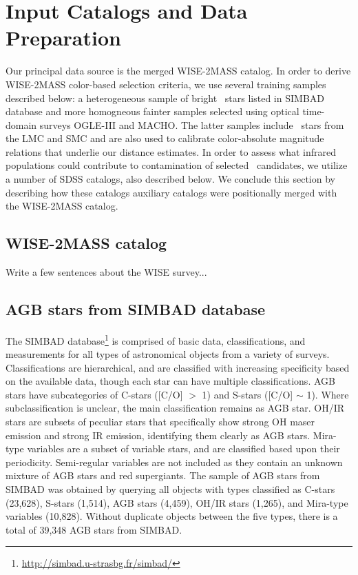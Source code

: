 \section{Input Catalogs and Data Preparation}
\label{sec:data}

Our principal data source is the merged WISE-2MASS catalog. In order to derive
WISE-2MASS color-based selection criteria, we use several training samples
described below: a heterogeneous sample of bright \agb\ stars listed in 
SIMBAD database and more homogneous fainter samples selected using 
optical time-domain surveys OGLE-III and MACHO. The latter samples 
include \agb\ stars from the LMC and SMC and are also used to 
calibrate color-absolute magnitude relations that underlie our distance
estimates. In order to assess what infrared populations could contribute to
contamination of selected \agb\ candidates, we utilize a number of SDSS
catalogs, also described below. We conclude this section by describing
how these catalogs auxiliary catalogs were  positionally merged with the 
WISE-2MASS catalog. 

\subsection{WISE-2MASS catalog}
Write a few sentences about the WISE survey...

\subsection{AGB stars from SIMBAD database}
The SIMBAD database\footnote{\url{http://simbad.u-strasbg.fr/simbad/}} is comprised of basic data, classifications, and measurements for all types of astronomical objects from a variety of surveys.  Classifications are hierarchical, and are classified with increasing specificity based on the available data, though each star can have multiple classifications. AGB stars have subcategories of C-stars ([C/O] $>$ 1) and S-stars ([C/O] $\sim$ 1). Where subclassification is unclear, the main classification remains as AGB star. OH/IR stars are subsets of peculiar stars that specifically show strong OH maser emission and strong IR emission, identifying them clearly as AGB stars.  Mira-type variables are a subset of variable stars, and are classified based upon their periodicity. Semi-regular variables are not included as they contain an unknown mixture of AGB stars and red supergiants. The sample of AGB stars from SIMBAD was obtained by querying all objects with types classified as C-stars (23,628), S-stars (1,514), AGB stars (4,459), OH/IR stars (1,265), and Mira-type variables (10,828). Without duplicate objects between the five types, there is a total of 39,348 AGB stars from SIMBAD.

